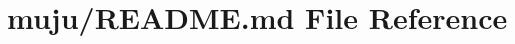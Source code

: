 \hypertarget{_r_e_a_d_m_e_8md}{}\section{muju/\+R\+E\+A\+D\+ME.md File Reference}
\label{_r_e_a_d_m_e_8md}

